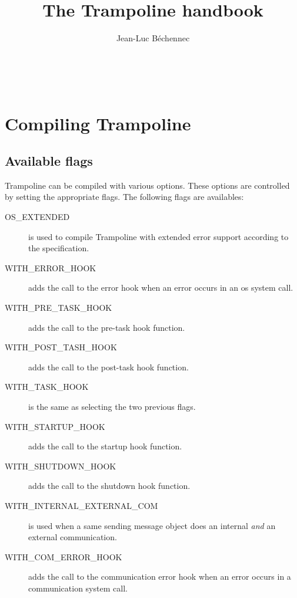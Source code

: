 \documentclass[11pt]{manual}
\title{The Trampoline handbook}
\author{Jean-Luc B\'echennec}
\begin{document}
\maketitle
~\newpage
\setcounter{tocdepth}{2}
\tableofcontents

\chapter{Compiling Trampoline}

\section{Available flags}

Trampoline can be compiled with various options. These options are controlled by setting the appropriate flags. The following flags are availables:
\begin{description}
\item[OS\_EXTENDED] is used to compile Trampoline with extended error support according to the specification.
\item[WITH\_ERROR\_HOOK] adds the call to the error hook when an error occurs in an os system call.
\item[WITH\_PRE\_TASK\_HOOK] adds the call to the pre-task hook function.
\item[WITH\_POST\_TASH\_HOOK]  adds the call to the post-task hook function.
\item[WITH\_TASK\_HOOK] is the same as selecting the two previous flags.
\item[WITH\_STARTUP\_HOOK] adds the call to the startup hook function.
\item[WITH\_SHUTDOWN\_HOOK] adds the call to the shutdown hook function.
\item[WITH\_INTERNAL\_EXTERNAL\_COM] is used when a same sending message object does an internal \emph{and} an external communication.
\item[WITH\_COM\_ERROR\_HOOK] adds the call to the communication error hook when an error occurs in a communication system call.
\end{description}





 
\end{document}
